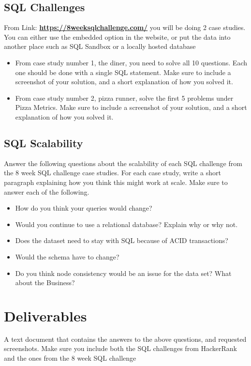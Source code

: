 \documentclass[12pt]{article}
\begin{document}
\subsection*{SQL Challenges}

    From Link: \href{https://8weeksqlchallenge.com/}{\textbf{https://8weeksqlchallenge.com/}} you will be doing 2 case studies.  You can either use the embedded option in the website, or put the data into another place such as SQL Sandbox or a locally hosted database
\begin{itemize}
    \item From case study number 1, the diner, you need to solve all 10 questions.  Each one should be done with a single SQL statement.  Make sure to include a screenshot of your solution, and a short explanation of how you solved it. 
    \item From case study number 2, pizza runner, solve the first 5 problems under Pizza Metrics.  Make sure to include a screenshot of your solution, and a short explanation of how you solved it.
\end{itemize}

\subsection*{SQL Scalability}
 Answer the following questions about the scalability of each SQL challenge from the 8 week SQL challenge case studies. For each case study, write a short paragraph explaining how you think this might work at scale. Make sure to answer each of the following.

\begin{itemize}
  \item How do you think your queries would change? 
  \item Would you continue to use a relational database? Explain why or why not. 
  \item Does the dataset need to stay with SQL because of ACID transactions?
  \item Would the schema have to change?
  \item Do you think node consistency would be an issue for the data set? What about the Business?
\end{itemize}

\section*{Deliverables}
A text document that contains the answers to the above questions, and requested screenshots.  Make sure you include both the SQL challenges from HackerRank and the ones from the 8 week SQL challenge
\end{document}
